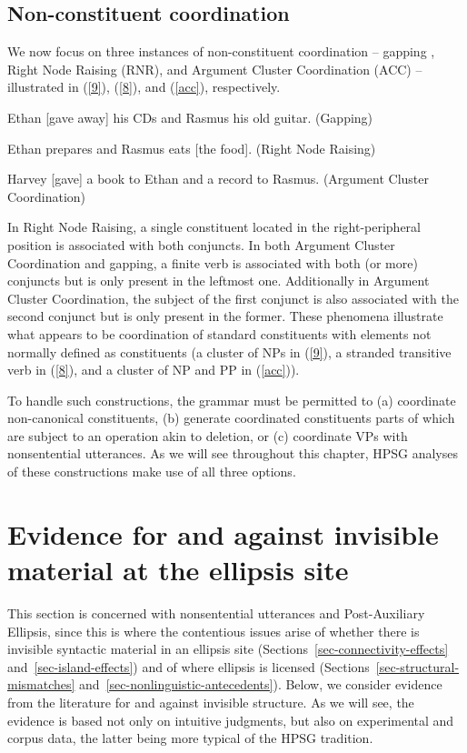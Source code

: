 \subsection{Non-constituent coordination}

We now focus on three instances of non-constituent coordination -- gapping \citep[171]{Ross1967}, Right Node Raising (RNR), and Argument Cluster Coordination (ACC) -- illustrated in (\ref{9}), (\ref{8}), and (\ref{acc}), respectively.

 \ea Ethan [gave away] his CDs and Rasmus his old guitar. (Gapping)\label{9}\z

 \ea %
 Ethan prepares and Rasmus eats [the food]. (Right Node Raising)
 \label{8}\z

\eanoraggedright
Harvey [gave] a book to Ethan and a record to Rasmus. (Argument Cluster Coordination) \label{acc}
\z

\noindent 
In Right Node Raising, a single constituent located in the right-peripheral position is associated with both conjuncts. In both Argument Cluster Coordination and gapping, a finite verb is associated with both (or more) conjuncts but is only present in the leftmost one. Additionally in Argument Cluster Coordination, the subject of the first conjunct is also associated with the second conjunct but is only present in the former. These phenomena illustrate what appears to be coordination of standard constituents with elements not normally defined as constituents (a cluster of NPs in (\ref{9}), a stranded transitive verb in (\ref{8}), and a cluster of NP and PP in (\ref{acc})).
%

 To handle such constructions, the grammar must be permitted to (a) coordinate non-canonical constituents, (b) generate coordinated constituents parts of which are subject to an operation akin to deletion, or (c) coordinate VPs with nonsentential utterances. As we will see throughout this chapter, HPSG analyses of these constructions make use of all three options.

\section{Evidence for and against invisible material at the ellipsis site}
\label{sec-evidence-for-invisible-material}

This section is concerned with nonsentential utterances and Post-Auxiliary Ellipsis, since this is where the contentious issues arise of
 whether there is invisible syntactic material in an ellipsis site (Sections~\ref{sec-connectivity-effects} and~\ref{sec-island-effects}) and of where ellipsis is licensed (Sections~\ref{sec-structural-mismatches} and~\ref{sec-nonlinguistic-antecedents}).  Below, we consider evidence from the literature for and against invisible structure. As we will see, the evidence is based not only on intuitive judgments, but also on experimental and corpus data, the latter being more typical of the HPSG tradition.


